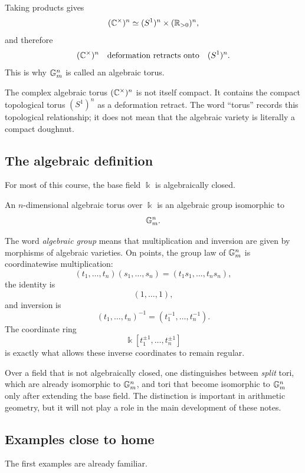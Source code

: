 Taking products gives
\[
(\mathbb{C}^\times)^n
\simeq
(S^1)^n\times(\mathbb{R}_{>0})^n,
\]
and therefore
\[
(\mathbb{C}^\times)^n
\quad\text{deformation retracts onto}\quad
(S^1)^n.
\]
This is why \(\mathbb{G}_{m}^n\) is called an algebraic torus.

\begin{warningbox}
The complex algebraic torus \((\mathbb{C}^\times)^n\) is not itself compact.
It contains the compact topological torus \((S^1)^n\) as a deformation
retract. The word ``torus'' records this topological relationship; it
does not mean that the algebraic variety is literally a compact
doughnut.
\end{warningbox}

\subsection{The algebraic definition}

For most of this course, the base field \(\Bbbk\) is algebraically
closed.

\begin{definition}
An \(n\)-dimensional algebraic torus over \(\Bbbk\) is an algebraic
group isomorphic to
\[
\mathbb{G}_{m}^n.
\]
\end{definition}

The word \emph{algebraic group} means that multiplication and inversion
are given by morphisms of algebraic varieties. On points, the group law
of \(\mathbb{G}_{m}^n\) is coordinatewise multiplication:
\[
(t_1,\ldots,t_n)(s_1,\ldots,s_n)
=
(t_1s_1,\ldots,t_ns_n),
\]
the identity is
\[
(1,\ldots,1),
\]
and inversion is
\[
(t_1,\ldots,t_n)^{-1}
=
(t_1^{-1},\ldots,t_n^{-1}).
\]
The coordinate ring
\[
\Bbbk[t_1^{\pm1},\ldots,t_n^{\pm1}]
\]
is exactly what allows these inverse coordinates to remain regular.

\begin{observation}
Over a field that is not algebraically closed, one distinguishes
between \emph{split} tori, which are already isomorphic to
\(\mathbb{G}_{m}^n\), and tori that become isomorphic to \(\mathbb{G}_{m}^n\) only after
extending the base field. The distinction is important in arithmetic
geometry, but it will not play a role in the main development of these
notes.
\end{observation}

\subsection{Examples close to home}

The first examples are already familiar.

